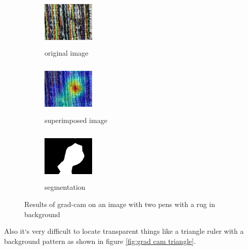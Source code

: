 \documentclass[../ImageClassifier.tex]{subfiles}
\begin{document}
    \begin{figure}[ht!]
        \begin{subfigure}{.32\textwidth}
          \centering
          \includegraphics[height=2.5cm, width=2.5cm]{./attachments/results/6-pen.jpg}
          \caption{original image}
          \label{fig:original image}
        \end{subfigure}
        \begin{subfigure}{.32\textwidth}
          \centering
          \includegraphics[height=2.5cm, width=2.5cm]{./attachments/results/6-pen-grad.jpg}
          \caption{superimposed image}
          \label{fig:heatmap activasion}
        \end{subfigure}
        \begin{subfigure}{.32\textwidth}
            \centering
            \includegraphics[height=2.5cm, width=2.5cm]{./attachments/results/6-pen-seg.jpg}
            \caption{segmentation}
            \label{fig:heatmap resized}
        \end{subfigure}
        \caption{Results of \ac{grad-cam} on an image with two pens with a rug in background}
        \label{fig:grad cam rug}
    \end{figure}
    \newline 
    Also it`s very difficult to locate transparent things like a triangle ruler with a background pattern as shown in figure \ref{fig:grad cam triangle}.
\end{document}
